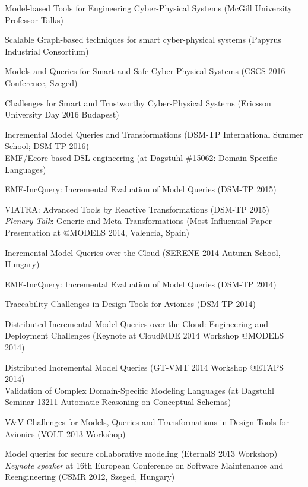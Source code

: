 \documentclass{xetexCV}
\begin{document}
Model-based Tools for Engineering Cyber-Physical Systems (McGill University Professor Talks)

Scalable  Graph-based techniques for smart cyber-physical systems (Papyrus Industrial Consortium)

Models and Queries for Smart and Safe Cyber-Physical Systems (CSCS 2016 Conference, Szeged)

Challenges for Smart and Trustworthy Cyber-Physical Systems (Ericsson University Day 2016 Budapest)

Incremental Model Queries and Transformations (DSM-TP International Summer School; DSM-TP 2016) \\

EMF/Ecore-based DSL engineering  (at Dagstuhl \#15062:  Domain-Specific Languages)

EMF-IncQuery: Incremental Evaluation of Model Queries (DSM-TP 2015)  

VIATRA: Advanced Tools by Reactive Transformations (DSM-TP 2015) \\

\emph{Plenary Talk}: Generic and Meta-Transformations  (Most Influential Paper Presentation at @MODELS 2014, Valencia, Spain)

Incremental Model Queries over the Cloud (SERENE 2014 Autumn School, Hungary)


EMF-IncQuery: Incremental Evaluation of Model Queries (DSM-TP 2014)


Traceability Challenges in Design Tools for Avionics (DSM-TP 2014) 

Distributed Incremental  Model Queries over the Cloud: Engineering and Deployment Challenges 
(Keynote at CloudMDE 2014 Workshop @MODELS 2014)


Distributed Incremental Model Queries (GT-VMT 2014 Workshop @ETAPS 2014) \\


Validation of Complex Domain-Specific Modeling Languages  (at Dagstuhl Seminar 13211 
Automatic Reasoning on Conceptual Schemas)


V\&V Challenges for Models, Queries and Transformations in Design Tools for Avionics (VOLT 2013 Workshop)


Model queries for secure collaborative modeling (EternalS 2013 Workshop) \\

\emph{Keynote speaker}  at 16th European Conference on Software Maintenance
and Reengineering (CSMR 2012, Szeged, Hungary) 
\end{document}
